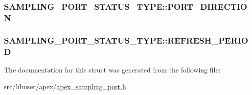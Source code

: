 \subsubsection[{\texorpdfstring{P\+O\+R\+T\+\_\+\+D\+I\+R\+E\+C\+T\+I\+ON}{PORT_DIRECTION}}]{ S\+A\+M\+P\+L\+I\+N\+G\+\_\+\+P\+O\+R\+T\+\_\+\+S\+T\+A\+T\+U\+S\+\_\+\+T\+Y\+P\+E\+::\+P\+O\+R\+T\+\_\+\+D\+I\+R\+E\+C\+T\+I\+ON}\hypertarget{structSAMPLING__PORT__STATUS__TYPE_ae9fbcccaa93fd7f7c811a4e8374933af}{}\label{structSAMPLING__PORT__STATUS__TYPE_ae9fbcccaa93fd7f7c811a4e8374933af}
\subsubsection[{\texorpdfstring{R\+E\+F\+R\+E\+S\+H\+\_\+\+P\+E\+R\+I\+OD}{REFRESH_PERIOD}}]{ S\+A\+M\+P\+L\+I\+N\+G\+\_\+\+P\+O\+R\+T\+\_\+\+S\+T\+A\+T\+U\+S\+\_\+\+T\+Y\+P\+E\+::\+R\+E\+F\+R\+E\+S\+H\+\_\+\+P\+E\+R\+I\+OD}\hypertarget{structSAMPLING__PORT__STATUS__TYPE_af01743f2cd919f7d8198a758160f3e58}{}\label{structSAMPLING__PORT__STATUS__TYPE_af01743f2cd919f7d8198a758160f3e58}


The documentation for this struct was generated from the following file\+:\begin{DoxyCompactItemize}
\item 
src/libuser/apex/\hyperlink{apex__sampling__port_8h}{apex\+\_\+sampling\+\_\+port.\+h}\end{DoxyCompactItemize}
